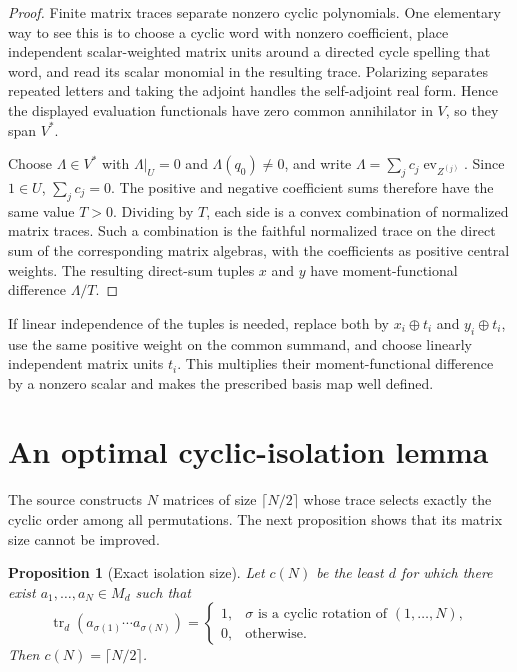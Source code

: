 \documentclass[11pt]{article}
\newtheorem{proposition}[theorem]{Proposition}
\theoremstyle{remark}
\newcommand{\tr}{\operatorname{tr}}
\begin{document}
\begin{proof}
Finite matrix traces separate nonzero cyclic polynomials.  One elementary
way to see this is to choose a cyclic word with nonzero coefficient, place
independent scalar-weighted matrix units around a directed cycle spelling
that word, and read its scalar monomial in the resulting trace.  Polarizing
separates repeated letters and taking the adjoint handles the self-adjoint
real form.  Hence the displayed evaluation functionals have zero common
annihilator in $V$, so they span $V^*$.

Choose $\Lambda\in V^*$ with $\Lambda|_U=0$ and
$\Lambda(q_0)\ne0$, and write
$\Lambda=\sum_j c_j\operatorname{ev}_{Z^{(j)}}$.  Since $1\in U$,
$\sum_jc_j=0$.  The positive and negative coefficient sums therefore have
the same value $T>0$.  Dividing by $T$, each side is a convex combination of
normalized matrix traces.  Such a combination is the faithful normalized
trace on the direct sum of the corresponding matrix algebras, with the
coefficients as positive central weights.  The resulting direct-sum tuples
$x$ and $y$ have moment-functional difference $\Lambda/T$.
\end{proof}

If linear independence of the tuples is needed, replace both by
$x_i\oplus t_i$ and $y_i\oplus t_i$, use the same positive weight on the
common summand, and choose linearly independent matrix units $t_i$.  This
multiplies their moment-functional difference by a nonzero scalar and makes
the prescribed basis map well defined.

\section{An optimal cyclic-isolation lemma}

The source constructs $N$ matrices of size $\lceil N/2\rceil$ whose trace
selects exactly the cyclic order among all permutations.  The next
proposition shows that its matrix size cannot be improved.

\begin{proposition}[Exact isolation size]\label{prop:isolation}
Let $c(N)$ be the least $d$ for which there exist $a_1,\ldots,a_N\in M_d$
such that
\[
 \tr_d(a_{\sigma(1)}\cdots a_{\sigma(N)})=
 \begin{cases}
  1,&\sigma\text{ is a cyclic rotation of }(1,\ldots,N),\\
  0,&\text{otherwise}.
 \end{cases}
\]
Then $c(N)=\lceil N/2\rceil$.
\end{proposition}
\end{document}
